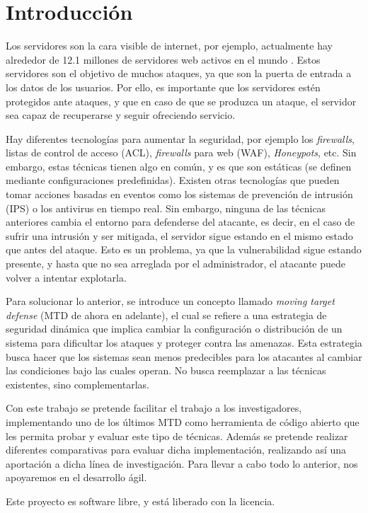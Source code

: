 \chapter{Introducción}

Los servidores son la cara visible de internet, por ejemplo, actualmente hay alrededor de 12.1 millones de servidores web activos en el mundo \cite{netcraft-agosto23}. Estos servidores son el objetivo de muchos ataques, ya que son la puerta de entrada a los datos de los usuarios.\cite{breaches-2023} Por ello, es importante que los servidores estén protegidos ante ataques, y que en caso de que se produzca un ataque, el servidor sea capaz de recuperarse y seguir ofreciendo servicio.

Hay diferentes tecnologías para aumentar la seguridad, por ejemplo los \textit{firewalls}, listas de control de acceso (ACL), \textit{firewalls} para web (WAF), \textit{Honeypots}, etc. Sin embargo, estas técnicas tienen algo en común, y es que son estáticas (se definen mediante configuraciones predefinidas). Existen otras tecnologías que pueden tomar acciones basadas en eventos como los sistemas de prevención de intrusión (IPS) o los antivirus en tiempo real. Sin embargo, ninguna de las técnicas anteriores cambia el entorno para defenderse del atacante, es decir, en el caso de sufrir una intrusión y ser mitigada, el servidor sigue estando en el mismo estado que antes del ataque. Esto es un problema, ya que la vulnerabilidad sigue estando presente, y hasta que no sea arreglada por el administrador, el atacante puede volver a intentar explotarla.

Para solucionar lo anterior, se introduce un concepto llamado \textit{moving target defense}\cite{big-state-of-art} (MTD de ahora en adelante), el cual se refiere a una estrategia de seguridad dinámica que implica cambiar la configuración o distribución de un sistema para dificultar los ataques y proteger contra las amenazas. Esta estrategia busca hacer que los sistemas sean menos predecibles para los atacantes al cambiar las condiciones bajo las cuales operan. No busca reemplazar a las técnicas existentes, sino complementarlas.

Con este trabajo se pretende facilitar el trabajo a los investigadores, implementando uno de los últimos MTD como herramienta de código abierto que les permita probar y evaluar este tipo de técnicas. Además se pretende realizar diferentes comparativas para evaluar dicha implementación, realizando así una aportación a dicha línea de investigación. Para llevar a cabo todo lo anterior, nos apoyaremos en el desarrollo ágil.

Este proyecto es software libre, y está liberado con la licencia\cite{gplv3}.